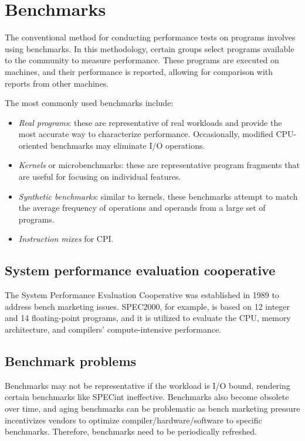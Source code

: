 \section{Benchmarks}

The conventional method for conducting performance tests on programs involves using benchmarks.
In this methodology, certain groups select programs available to the community to measure performance.
These programs are executed on machines, and their performance is reported, allowing for comparison with reports from other machines.

The most commonly used benchmarks include:
\begin{itemize}
    \item \textit{Real programs}: these are representative of real workloads and provide the most accurate way to characterize performance. 
        Occasionally, modified CPU-oriented benchmarks may eliminate I/O operations.
    \item \textit{Kernels} or microbenchmarks: these are representative program fragments that are useful for focusing on individual features.
    \item \textit{Synthetic benchmarks}: similar to kernels, these benchmarks attempt to match the average frequency of operations and operands from a large set of programs.
    \item \textit{Instruction mixes} for CPI. 
\end{itemize}

\subsection{System performance evaluation cooperative}
The System Performance Evaluation Cooperative was established in 1989 to address bench marketing issues. 
SPEC2000, for example, is based on 12 integer and 14 floating-point programs, and it is utilized to evaluate the CPU, memory architecture, and compilers' compute-intensive performance.

\subsection{Benchmark problems}
Benchmarks may not be representative if the workload is I/O bound, rendering certain benchmarks like SPECint ineffective.
Benchmarks also become obsolete over time, and aging benchmarks can be problematic as bench marketing pressure incentivizes vendors to optimize compiler/hardware/software to specific benchmarks. 
Therefore, benchmarks need to be periodically refreshed.

